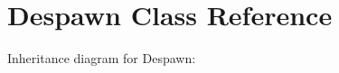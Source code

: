 \hypertarget{classDespawn}{}\section{Despawn Class Reference}
\label{classDespawn}


Inheritance diagram for Despawn\+:
